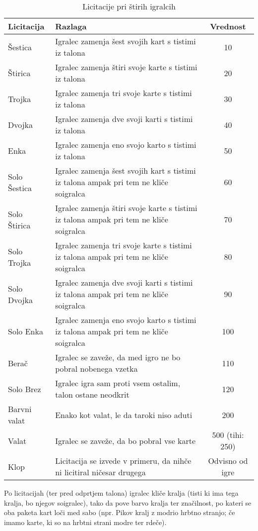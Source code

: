\documentclass[a4paper, ]{report}
\begin{document}
\begin{table}
  \caption{Licitacije pri štirih igralcih}
  \begin{tabularx}{\textwidth}{lXc}
    \toprule
    \textbf{Licitacija} & \textbf{Razlaga} & \textbf{Vrednost} \\ \toprule
    Šestica & Igralec zamenja šest svojih kart s tistimi iz talona & 10 \\ \hline
    Štirica & Igralec zamenja štiri svoje karte s tistimi iz talona & 20 \\ \hline
    Trojka & Igralec zamenja tri svoje karte s tistimi iz talona & 30 \\ \hline
    Dvojka & Igralec zamenja dve svoji karti s tistimi iz talona & 40 \\ \hline
    Enka & Igralec zamenja eno svojo karto s tistimi iz talona & 50 \\ \hline
    Solo Šestica & Igralec zamenja šest svojih kart s tistimi iz talona ampak pri tem ne kliče soigralca & 60 \\ \hline
    Solo Štirica & Igralec zamenja štiri svoje karte s tistimi iz talona ampak pri tem ne kliče soigralca & 70 \\ \hline
    Solo Trojka & Igralec zamenja tri svoje karte s tistimi iz talona ampak pri tem ne kliče soigralca & 80 \\ \hline
    Solo Dvojka & Igralec zamenja dve svoji karti s tistimi iz talona ampak pri tem ne kliče soigralca & 90 \\ \hline
    Solo Enka & Igralec zamenja eno svojo karto s tistimi iz talona ampak pri tem ne kliče soigralca & 100 \\ \hline
    Berač & Igralec se zaveže, da med igro ne bo pobral nobenega vzetka & 110 \\ \hline
    Solo Brez & Igralec igra sam proti vsem ostalim, talon ostane neodkrit & 120 \\ \hline
    Barvni valat & Enako kot valat, le da taroki niso aduti & 200 \\ \hline
    Valat & Igralec se zaveže, da bo pobral vse karte & 500 (tihi: 250)\\ \hline
    Klop & Licitacija se izvede v primeru, da nihče ni licitiral ničesar drugega & Odvisno od igre \\ \bottomrule
  \end{tabularx}
\end{table}

Po licitacijah (ter pred odprtjem talona) igralec kliče kralja (tisti ki ima tega kralja, bo njegov soigralec), tako da pove barvo kralja ter značilnost, po kateri se oba paketa kart loči med sabo (npr. Pikov kralj z modrio hrbtno stranjo; če imamo karte, ki so na hrbtni strani modre ter rdeče).
\end{document}
